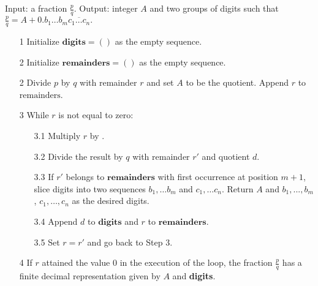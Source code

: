 \begin{frame}
\vskip -0.2cm
\begin{algorithm}
Input: a fraction $\frac{p}{q}$. Output: integer $A$ and two groups of digits such that 
$
\frac{p}{q} = A + 0.b_1\dots b_m\overline{c_1\dots c_n}.
$
\begin{itemize} 
	
\item[1] Initialize $\textbf{digits}=()$ as the empty sequence.
\item[2] Initialize $\textbf{remainders}=()$ as the empty sequence.
\item[2] Divide $p$ by $q$ with remainder $r$ and set $A$ to be the quotient. Append $r$ to $\text{remainders}$.
\item[3] While $r$ is not equal to zero:
\begin{itemize}
\item[3.1] Multiply $r$ by . 
\item[3.2] Divide the result by $q$ with remainder $r'$ and quotient $d$.  
\item[3.3] If $r'$ belongs to $\textbf{remainders}$ with first occurrence at position $m+1$, slice digits into two sequences $b_1, \dots b_{m} $ and $c_1, \dots c_n$. Return $A$ and $b_1, ..., b_m$, $c_1, \dots, c_n$ as the desired digits.
\item[3.4] Append $d$ to $\textbf{digits}$ and $r$ to $\textbf{remainders}$.
\item[3.5] Set $r=r'$ and go back to Step 3.
\end{itemize}
\item[4] If $r$ attained the value $0$ in the execution of the loop, the fraction $\frac{p}{q}$ has a finite decimal representation given by $A$ and \textbf{digits}.
	
\end{itemize}
\end{algorithm}

\end{frame}